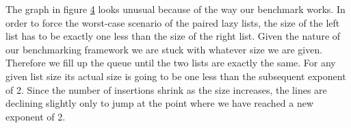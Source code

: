 \begin{figure}[htb]
\centering

\label{simple}
\end{figure}

\begin{figure}[htb]
\centering

\label{simple-high}
\end{figure}


\begin{figure}[htb]
\centering

\label{reuse-remove-2}
\end{figure}

The graph in figure \ref{reuse-remove-4} looks unusual because of the way our benchmark works. In order to force the worst-case scenario of the paired lazy lists, the size of the left list has to be exactly one less than the size of the right list. Given the nature of our benchmarking framework we are stuck with whatever size we are given. Therefore we fill up the queue until the two lists are exactly the same. For any given list size its actual size is going to be one less than the subsequent exponent of 2. Since the number of insertions shrink as the size increases, the lines are declining slightly only to jump at the point where we have reached a new exponent of 2.


\begin{figure}[htb]
\centering

\label{reuse-remove-4}
\end{figure}

